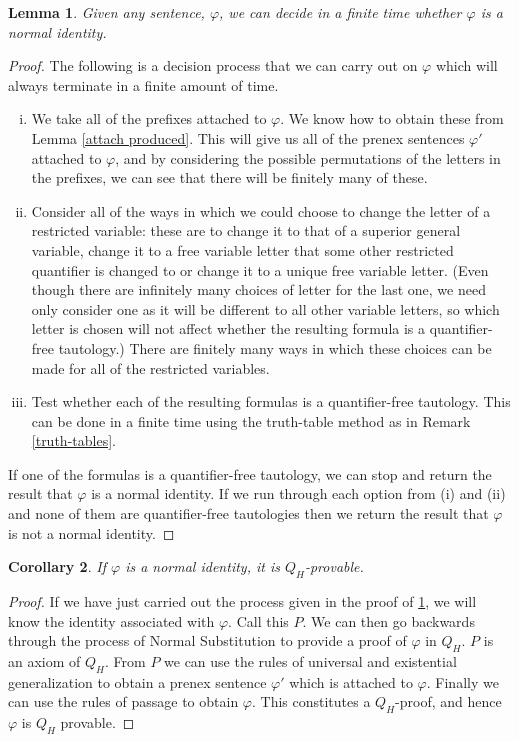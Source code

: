 \documentclass[a4paper,12pt]{report}
\newtheorem{lem}{Lemma}[section]
\newtheorem{cor}[lem]{Corollary}
\theoremstyle{definition}
\begin{document}
\begin{lem}
\label{normfin}
Given any sentence, $\varphi$, we can decide in a finite time whether $\varphi$ is a normal identity.
\end{lem}
\begin{proof}
The following is a decision process that we can carry out on $\varphi$ which will always terminate in a finite amount of time. 
\begin{enumerate}[(i)]
\item We take all of the prefixes attached to $\varphi$. We know how to obtain these from Lemma \ref{attach produced}. This will give us all of the prenex sentences $\varphi'$ attached to $\varphi$, and by considering the possible permutations of the letters in the prefixes, we can see that there will be finitely many of these.
\item Consider all of the ways in which we could choose to change the letter of a restricted variable: these are to change it to that of a superior general variable, change it to a free variable letter that some other restricted quantifier is changed to or change it to a unique free variable letter. (Even though there are infinitely many choices of letter for the last one, we need only consider one as it will be different to all other variable letters, so which letter is chosen will not affect whether the resulting formula is a quantifier-free tautology.) There are finitely many ways in which these choices can be made for all of the restricted variables.
\item Test whether each of the resulting formulas is a quantifier-free tautology. This can be done in a finite time using the truth-table method as in Remark \ref{truth-tables}.
\end{enumerate}
If one of the formulas is a quantifier-free tautology, we can stop and return the result that $\varphi$ is a normal identity. If we run through each option from (i) and (ii) and none of them are quantifier-free tautologies then we return the result that $\varphi$ is not a normal identity.
\end{proof}

\begin{cor}
If $\varphi$ is a normal identity, it is $Q_H$-provable.
\end{cor}
\begin{proof}
If we have just carried out the process given in the proof of \ref{normfin}, we will know the identity associated with $\varphi$. Call this $P$. We can then go backwards through the process of Normal Substitution to provide a proof of $\varphi$ in $Q_H$. $P$ is an axiom of $Q_H$. From $P$ we can use the rules of universal and existential generalization to obtain a prenex sentence $\varphi'$ which is attached to $\varphi$. Finally we can use the rules of passage to obtain $\varphi$. This constitutes a $Q_H$-proof, and hence $\varphi$ is $Q_H$ provable.
\end{proof}
\end{document}
